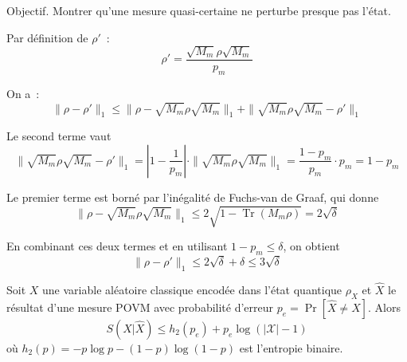 \begin{sloppypar}
\begin{Preuve}\label{prv:mesure_douce}

\begin{cmtEtape}{Objectif.}
Montrer qu'une mesure quasi-certaine ne perturbe presque pas l'\'etat.
\end{cmtEtape}

Par d\'efinition de $\rho'$~:
\begin{equation}
\rho' = \frac{\sqrt{M_m}\rho\sqrt{M_m}}{p_m}
\end{equation}

On a~:
\begin{equation}
\|\rho - \rho'\|_1 \leq \|\rho - \sqrt{M_m}\rho\sqrt{M_m}\|_1 + \|\sqrt{M_m}\rho\sqrt{M_m} - \rho'\|_1
\end{equation}

Le second terme vaut
\begin{equation}
\|\sqrt{M_m}\rho\sqrt{M_m} - \rho'\|_1 = \left|1 - \frac{1}{p_m}\right| \cdot \|\sqrt{M_m}\rho\sqrt{M_m}\|_1 = \frac{1 - p_m}{p_m} \cdot p_m = 1 - p_m
\end{equation}

Le premier terme est born\'e par l'in\'egalit\'e de Fuchs-van de Graaf, qui donne
\begin{equation}
\|\rho - \sqrt{M_m}\rho\sqrt{M_m}\|_1 \leq 2\sqrt{1 - \operatorname{Tr}(M_m\rho)} = 2\sqrt{\delta}
\end{equation}

En combinant ces deux termes et en utilisant $1 - p_m \leq \delta$, on obtient
\begin{equation}
\|\rho - \rho'\|_1 \leq 2\sqrt{\delta} + \delta \leq 3\sqrt{\delta}
\end{equation}
\end{Preuve}

\begin{lemma}\label{lem:fano_quantique}
Soit $X$ une variable al\'eatoire classique encod\'ee dans l'\'etat quantique
$\rho_X$ et $\hat{X}$ le r\'esultat d'une mesure POVM avec probabilit\'e
d'erreur $p_e = \Pr[\hat{X} \neq X]$. Alors
\begin{equation}
S(X|\hat{X}) \leq h_2(p_e) + p_e \log(|\mathcal{X}| - 1)
\end{equation}
o\`u $h_2(p) = -p\log p - (1-p)\log(1-p)$ est l'entropie binaire.
\end{lemma}


\end{sloppypar}
